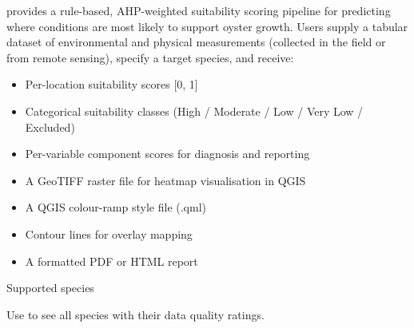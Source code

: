 \documentclass[a4paper]{book}
\begin{document}
%
\begin{Description}
 provides a rule-based, AHP-weighted suitability scoring
pipeline for predicting where conditions are most likely to support oyster
growth. Users supply a tabular dataset of environmental and physical
measurements (collected in the field or from remote sensing), specify a
target species, and receive:
\begin{itemize}

\item{} Per-location suitability scores [0, 1]
\item{} Categorical suitability classes (High / Moderate / Low / Very Low / Excluded)
\item{} Per-variable component scores for diagnosis and reporting
\item{} A GeoTIFF raster file for heatmap visualisation in QGIS
\item{} A QGIS colour-ramp style file (.qml)
\item{} Contour lines for overlay mapping
\item{} A formatted PDF or HTML report

\end{itemize}

\end{Description}
%
\begin{Section}{Supported species}



Use  to see all species with their data quality ratings.
\end{Section}
\end{document}
